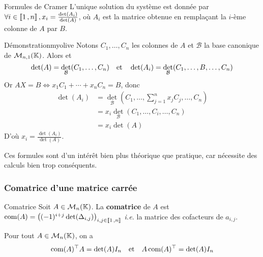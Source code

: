     \begin{prop}{Formules de Cramer}{}
        L’unique solution du système est donnée par $\forall i \in \left\llbracket 1 \, , n \right\rrbracket, x_i = \frac{\det(A_i)}{\det(A)}$, où $A_i$ est la matrice obtenue en remplaçant la $i$-ème colonne de $A$ par $B$.
    \end{prop}

    \begin{demo}{Démonstration}{myolive}
        Notons $C_1, \ldots, C_n$ les colonnes de $A$ et $\mathcal{B}$ la base canonique de $\mathcal{M}_{n,1}(\mathbb{K})$. Alors et \[ \det(A) = \det_{\mathcal{B}}(C_1,\ldots,C_n) \quad \text{et} \quad \det(A_i) = \det_{\mathcal{B}}(C_1, \ldots, B, \ldots, C_n) \]
        Or $AX = B \iff x_1 C_1 + \cdots + x_n C_n = B$, donc 
        \begin{align*}
            \det(A_i) 
            &= \det_{\mathcal{B}}\left(C_1, \ldots, \sum_{j=1}^n x_j C_j, \ldots, C_n\right) \\
            &= x_i \det_{\mathcal{B}}\left(C_1, \ldots, C_i, \ldots, C_n\right) \\
            &= x_i \det(A)
        \end{align*}
        D’où $x_i = \frac{\det(A_i)}{\det(A)}$.
    \end{demo}

    Ces formules sont d’un intérêt bien plus théorique que pratique, car nécessite des calculs bien trop conséquents.

    \subsubsection{Comatrice d’une matrice carrée}

    \begin{defi}{Comatrice}{}
        Soit $A \in \mathcal{M}_{n}(\mathbb{K})$. La \textbf{comatrice} de $A$ est $\operatorname{com}(A) = \left((-1)^{i + j} \det(\Delta_{i,j})\right)_{i,j \in \left\llbracket 1 \, , n \right\rrbracket}$ \textit{i.e.} la matrice des cofacteurs de $a_{i,j}$.
    \end{defi}

    \begin{prop}{}{}
        Pour tout $A \in \mathcal{M}_{n}(\mathbb{K})$, on a 
        \[ \operatorname{com}(A)^{\top} A = \det(A) I_n \quad \text{et} \quad A \operatorname{com}(A)^{\top} = \det(A) I_n \]
    \end{prop}

